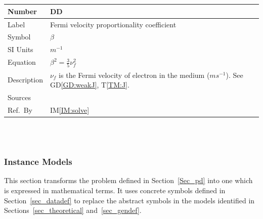 \documentclass[12pt]{article}
\newcommand{\colBwidth}{0.82\textwidth} \newcommand{\colCwidth}{0.1\textwidth}
\newcounter{defnum} %
\newcounter{datadefnum} %
\begin{document}
	~\newline
	
	
	~\newline
	
	\noindent \begin{minipage}{\textwidth} \renewcommand*{\arraystretch}{1.5}
		\begin{tabular}{| p{\colAwidth} | p{\colBwidth}|} \hline \rowcolor[gray]{0.9}
			Number& DD{datadefnum}\thedatadefnum \label{DD:beta}\\ \hline
			Label& Fermi velocity proportionality coefficient \\ \hline Symbol &$\beta$\\
			\hline %
			SI Units & $m^{-1}$\\ \hline Equation&$\beta^2 = \frac{3}{5} \nu_f^2$\\
			\hline Description & $\nu_f$ is the Fermi velocity of electron in the medium
			($ms^{-1}$). See GD\ref{GD:weakJ}, T\ref{TM:J}. \\ \hline Sources&
			\cite{hiremath2012numerical} \\ \hline Ref.\ By & IM\ref{IM:solve} \\ \hline
	\end{tabular} \end{minipage}\\
	
	~\newline
	
	
	
	
	\subsubsection{Instance Models} \label{sec_instance}
	
	This section transforms the problem defined in Section~\ref{Sec_pd} into one
	which is expressed in mathematical terms. It uses concrete symbols defined in
	Section~\ref{sec_datadef} to replace the abstract symbols in the models
	identified in Sections~\ref{sec_theoretical} and~\ref{sec_gendef}.
	
	
	
	
	
\end{document}
